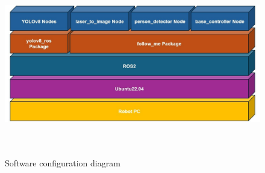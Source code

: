 \begin{figure}[h]
    \begin{center}
    \includegraphics[height=80mm,clip]{figure/Software.jpg}
    \caption{Software configuration diagram}
    \label{Software configuration diagram}
    \end{center}
\end{figure}

